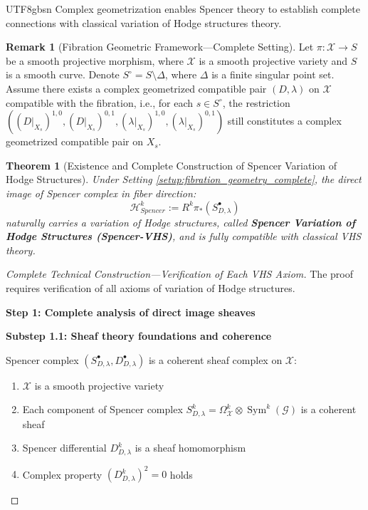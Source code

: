 \documentclass[a4paper,12pt]{extarticle}
\newtheorem{theorem}{Theorem}[section]
\theoremstyle{definition}
\newtheorem{remark}{Remark}[section]
\begin{document}
\begin{CJK}{UTF8}{gbsn}
Complex geometrization enables Spencer theory to establish complete connections with classical variation of Hodge structures theory.

\begin{remark}[Fibration Geometric Framework—Complete Setting]
\label{remark:fibration_geometry_complete}
Let $\pi: \mathcal{X} \to S$ be a smooth projective morphism, where $\mathcal{X}$ is a smooth projective variety and $S$ is a smooth curve. Denote $S^\circ = S \setminus \Delta$, where $\Delta$ is a finite singular point set. Assume there exists a complex geometrized compatible pair $(D,\lambda)$ on $\mathcal{X}$ compatible with the fibration, i.e., for each $s \in S^\circ$, the restriction $((D|_{X_s})^{1,0}, (D|_{X_s})^{0,1}, (\lambda|_{X_s})^{1,0}, (\lambda|_{X_s})^{0,1})$ still constitutes a complex geometrized compatible pair on $X_s$.
\end{remark}

\begin{theorem}[Existence and Complete Construction of Spencer Variation of Hodge Structures]
\label{thm:spencer_vhs_construction_complete}
Under Setting \ref{setup:fibration_geometry_complete}, the direct image of Spencer complex in fiber direction:
$$\mathcal{H}^k_{Spencer} := R^k\pi_*(S^{\bullet}_{D,\lambda})$$
naturally carries a variation of Hodge structures, called \textbf{Spencer Variation of Hodge Structures (Spencer-VHS)}, and is fully compatible with classical VHS theory.
\end{theorem}

\begin{proof}[Complete Technical Construction—Verification of Each VHS Axiom]
The proof requires verification of all axioms of variation of Hodge structures.

\textbf{Step 1: Complete analysis of direct image sheaves}

\textbf{Substep 1.1: Sheaf theory foundations and coherence}

Spencer complex $(S^{\bullet}_{D,\lambda}, D^{\bullet}_{D,\lambda})$ is a coherent sheaf complex on $\mathcal{X}$:
\begin{enumerate}
    \item $\mathcal{X}$ is a smooth projective variety
    \item Each component of Spencer complex $S^k_{D,\lambda} = \Omega^k_{\mathcal{X}} \otimes \operatorname{Sym}^k(\mathcal{G})$ is a coherent sheaf
    \item Spencer differential $D^k_{D,\lambda}$ is a sheaf homomorphism
    \item Complex property $(D^k_{D,\lambda})^2 = 0$ holds
\end{enumerate}


\end{proof}
\end{CJK}
\end{document}
